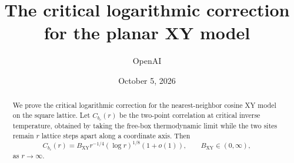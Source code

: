 \documentclass[11pt,a4paper]{article}
\title{The critical logarithmic correction\\for the planar XY model}
\author{OpenAI}
\date{October 5, 2026}
\theoremstyle{definition}
\begin{document}
\maketitle
\begin{abstract}
We prove the critical logarithmic correction for the nearest-neighbor cosine
XY model on the square lattice. Let \(C_{b_c}(r)\) be the two-point correlation
at critical inverse temperature, obtained by taking the free-box thermodynamic
limit while the two sites remain \(r\) lattice steps apart along a coordinate
axis. Then
\[
C_{b_c}(r)=B_{\mathrm{XY}}r^{-1/4}(\log r)^{1/8}(1+o(1)),
\qquad B_{\mathrm{XY}}\in(0,\infty),
\]
as \(r\to\infty\).
\end{abstract}









\end{document}
